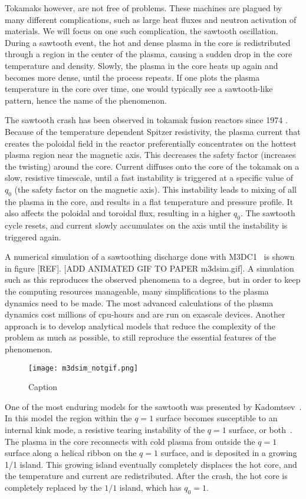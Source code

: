 \documentclass[%
superscriptaddress,
amsmath,amssymb,
aps,
pre,
floatfix,
]{revtex4-2}
\begin{document}
Tokamaks however, are not free of problems. These machines are plagued by many different complications, such as large heat fluxes and neutron activation of materials. We will focus on one such complication, the sawtooth oscillation. During a sawtooth event, the hot and dense plasma in the core is redistributed through a region in the center of the plasma, causing a sudden drop in the core temperature and density. Slowly, the plasma in the core heats up again and becomes more dense, until the process repeats. If one plots the plasma temperature in the core over time, one would typically see a sawtooth-like pattern, hence the name of the phenomenon.

The sawtooth crash has been observed in tokamak fusion reactors since 1974 \cite{von1974studies, vershkov1974role}.
Because of the temperature dependent Spitzer resistivity, the plasma current that creates the poloidal field in the reactor preferentially concentrates on the hottest plasma region near the magnetic axis.
This decreases the safety factor (increases the twisting) around the core.
Current diffuses onto the core of the tokamak on a slow, resistive timescale, until a fast instability is triggered at a specific value of $q_0$ (the safety factor on the magnetic axis).
This instability leads to mixing of all the plasma in the core, and results in a flat temperature and pressure profile.
It also affects the poloidal and toroidal flux, resulting in a higher $q_0$.
The sawtooth cycle resets, and current slowly accumulates on the axis until the instability is triggered again.

A numerical simulation of a sawtoothing discharge done with M3DC1~\cite{jardin2012multiple} is shown in figure [REF]. [ADD ANIMATED GIF TO PAPER m3dsim.gif]. 
A simulation such as this reproduces the observed phenomena to a degree, but in order to keep the computing resources manageable, many simplifications to the plasma dynamics need to be made. 
The most advanced calculations of the plasma dynamics cost millions of cpu-hours and are run on exascale devices. 
Another approach is to develop analytical models that reduce the complexity of the problem as much as possible, to still reproduce the essential features of the phenomenon. 

\begin{figure}
    \centering
    \texttt{[image: m3dsim\_notgif.png]}
    \caption{Caption}
    \label{fig:my_label}
\end{figure}

One of the most enduring models for the sawtooth was presented by Kadomtsev~\cite{kadomtsev1975disruptive}.
In this model the region within the $q=1$ surface becomes susceptible to an internal kink mode, a resistive tearing instability of the $q=1$ surface, or both~\cite{coppi1976resistive}.
The plasma in the core reconnects with cold plasma from outside the $q=1$ surface along a helical ribbon on the $q=1$ surface, and is deposited in a growing 1/1 island.
This growing island eventually completely displaces the hot core, and the temperature and current are redistributed.
After the crash, the hot core is completely replaced by the $1/1$ island, which has $q_0=1$.
\end{document}
